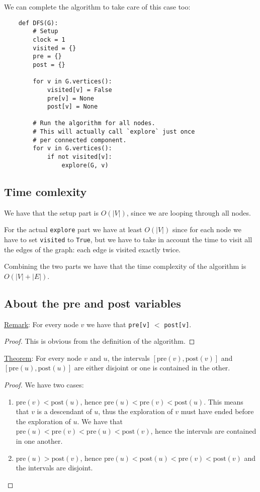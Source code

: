 \documentclass[10pt]{extarticle}
\begin{document}
We can complete the algorithm to take care of this case too:

\begin{verbatim}
    def DFS(G):
        # Setup
        clock = 1
        visited = {}
        pre = {}
        post = {}

        for v in G.vertices():
            visited[v] = False
            pre[v] = None
            post[v] = None

        # Run the algorithm for all nodes.
        # This will actually call `explore` just once
        # per connected component.
        for v in G.vertices():
            if not visited[v]:
                explore(G, v)

\end{verbatim}

\subsection{Time comlexity}

We have that the setup part is $O(|V|)$, since we are looping through all nodes.

For the actual \texttt{explore} part we have at least $O(|V|)$ since for each node we have to set \texttt{visited} to \texttt{True},
but we have to take in account the time to visit all the edges of the graph:
each edge is visited exactly twice.

Combining the two parts we have that the time complexity of the algorithm is $O(|V| + |E|)$.

\subsection{About the pre and post variables}

\underline{Remark}: For every node $v$ we have that \texttt{pre[v]} $<$ \texttt{post[v]}.

\begin{proof}
    This is obvious from the definition of the algorithm.
\end{proof}

\underline{Theorem}: For every node $v$ and $u$, the intervals $[\text{pre}(v), \text{post}(v)]$ and $[\text{pre}(u), \text{post}(u)]$ are either disjoint or one is contained in the other.

\begin{proof}
    We have two cases:
    \begin{enumerate}
        \item $\text{pre}(v) < \text{post}(u)$, hence $\text{pre}(u) < \text{pre}(v) < \text{post}(u)$. This means that $v$ is a descendant of $u$, thus the exploration of $v$ must have ended before the exploration of $u$.
              We have that $\text{pre}(u) < \text{pre}(v) < \text{pre}(u) < \text{post}(v)$, hence the intervals are contained in one another.
        \item $\text{pre}(u) > \text{post}(v)$, hence $\text{pre}(u) < \text{post}(u) < \text{pre}(v) < \text{post}(v)$ and the intervals are disjoint.
    \end{enumerate}
\end{proof}
\end{document}
